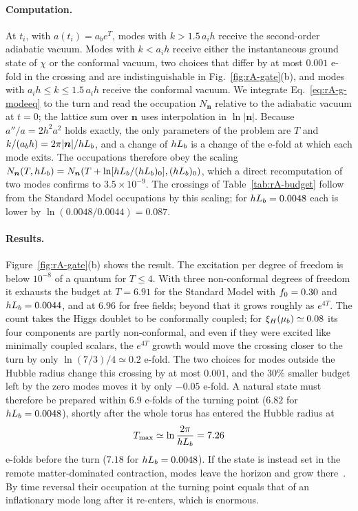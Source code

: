 \paragraph{Computation.}
At $t_i$, with $a(t_i)=a_be^T$, modes with $k>1.5\,a_ih$ receive the second-order adiabatic vacuum. %
Modes with $k<a_ih$ receive either the instantaneous ground state of $\chi$ or the conformal vacuum, two choices that differ by at most $0.001$ e-fold in the crossing and are indistinguishable in Fig.~\ref{fig:rA-gate}(b), and modes with $a_ih\leq k\leq1.5\,a_ih$ receive the conformal vacuum. %
We integrate Eq.~\eqref{eq:rA-g-modeeq} to the turn and read the occupation $N_{\bm n}$ relative to the adiabatic vacuum at $t=0$; the lattice sum over $\bm n$ uses interpolation in $\ln|\bm n|$.
Because $a''/a=2h^2a^2$ holds exactly, the only parameters of the problem are $T$ and $k/(a_bh)=2\pi|\bm n|/hL_b$, and a change of $hL_b$ is a change of the e-fold at which each mode exits.
The occupations therefore obey the scaling $N_{\bm n}(T,hL_b)=N_{\bm n}(T+\ln[hL_b/(hL_b)_0],(hL_b)_0)$, which a direct recomputation of two modes confirms to $3.5\times10^{-9}$. %
The crossings of Table~\ref{tab:rA-budget} follow from the Standard Model occupations by this scaling; for $hL_b=0.0048$ each is lower by $\ln(0.0048/0.0044)=0.087$. %

\paragraph{Results.}
Figure~\ref{fig:rA-gate}(b) shows the result.
The excitation per degree of freedom is below $10^{-8}$ of a quantum for $T\leq4$. %
With three non-conformal degrees of freedom it exhausts the budget at $T=6.91$ for the Standard Model with $f_0=0.30$ and $hL_b=0.0044$, and at $6.96$ for free fields; beyond that it grows roughly as $e^{4T}$. %
The count takes the Higgs doublet to be conformally coupled; for $\xi_H(\mu_b)\simeq0.08$ its four components are partly non-conformal, and even if they were excited like minimally coupled scalars, the $e^{4T}$ growth would move the crossing closer to the turn by only $\ln(7/3)/4\simeq0.2$ e-fold. %
The two choices for modes outside the Hubble radius change this crossing by at most $0.001$, and the $30\%$ smaller budget left by the zero modes moves it by only $-0.05$ e-fold. %
A natural state must therefore be prepared within $6.9$ e-folds of the turning point ($6.82$ for $hL_b=0.0048$), shortly after the whole torus has entered the Hubble radius at %
\begin{equation}
T_{\max}\simeq\ln\frac{2\pi}{hL_b}=7.26
\label{eq:rA-Tmax}
\end{equation} %
e-folds before the turn ($7.18$ for $hL_b=0.0048$). %
If the state is instead set in the remote matter-dominated contraction, modes leave the horizon and grow there~\cite{Wands:1998yp,Finelli:2001sr}.
By time reversal their occupation at the turning point equals that of an inflationary mode long after it re-enters, which is enormous.

